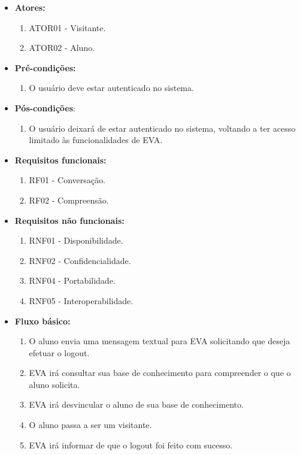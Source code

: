 \begin{itemize}
    \item \textbf{Atores:}
        \begin{enumerate}
            \item ATOR01 - Visitante.
            \item ATOR02 - Aluno.
        \end{enumerate}
    \item \textbf{Pré-condições:}
        \begin{enumerate}
            \item O usuário deve estar autenticado no sistema.
        \end{enumerate}
    \item \textbf{Pós-condições}:
        \begin{enumerate}
            \item O usuário deixará de estar autenticado no sistema, voltando a ter acesso limitado às funcionalidades de EVA.
        \end{enumerate}
    \item \textbf{Requisitos funcionais:}
        \begin{enumerate}
            \item RF01 - Conversação.
            \item RF02 - Compreensão.
        \end{enumerate}
    \item \textbf{Requisitos não funcionais:}
        \begin{enumerate}
            \item RNF01 - Disponibilidade.
            \item RNF02 - Confidencialidade.
            \item RNF04 - Portabilidade.
            \item RNF05 - Interoperabilidade.
        \end{enumerate}
    \item \textbf{Fluxo básico:}
        \begin{enumerate}
            \item O aluno envia uma mensagem textual para EVA solicitando que deseja efetuar o logout.
            \item EVA irá consultar sua base de conhecimento para compreender o que o aluno solicita.
            \item EVA irá desvincular o aluno de sua base de conhecimento.
            \item O aluno passa a ser um visitante.
            \item EVA irá informar de que o logout foi feito com sucesso.
        \end{enumerate}
\end{itemize}


